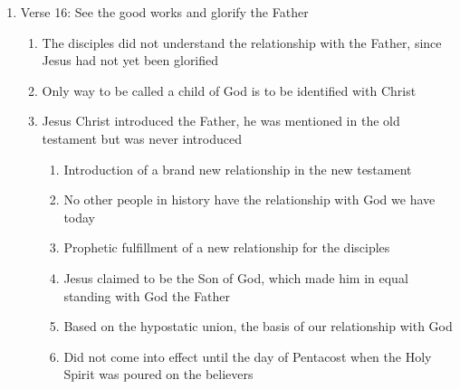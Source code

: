 \documentclass[11pt]{article}
\begin{document}
\begin{enumerate}
	\item Verse 16: See the good works and glorify the Father
	\begin{enumerate}
		\item The disciples did not understand the relationship with the Father, since Jesus had not yet been glorified
		\item Only way to be called a child of God is to be identified with Christ
		\item Jesus Christ introduced the Father, he was mentioned in the old testament but was never introduced
		\begin{enumerate}
			\item Introduction of a brand new relationship in the new testament
			\item No other people in history have the relationship with God we have today
			\item Prophetic fulfillment of a new relationship for the disciples
			\item Jesus claimed to be the Son of God, which made him in equal standing with God the Father
			\item Based on the hypostatic union, the basis of our relationship with God
			\item Did not come into effect until the day of Pentacost when the Holy Spirit was poured on the believers 
		\end{enumerate}
	\end{enumerate}


\end{enumerate}
\end{document}
